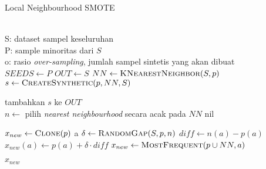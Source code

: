 \begin{algorithm}[htbp]
	\caption{Local Neighbourhood SMOTE}
	\label{alg:lnsmote}
	\begin{algorithmic}[1]
\Require \\
S: dataset sampel keseluruhan \\
P: sample minoritas dari $ S $ \\
o: rasio \textit{over-sampling}, jumlah sampel sintetis yang akan dibuat \\

	\State $ SEEDS \gets P $
	\State $ OUT \gets S $
		\State $ NN \gets \Call{KNearestNeighbor}{S, p} $
			\State $ s \gets \Call{CreateSynthetic}{p, NN, S} $

				\State tambahkan $ s $ ke $OUT$
			\EndIf
		\EndFor
	\EndFor
	\State {}
\EndFunction
\\
	\State $ n \gets $ pilih \textit{nearest neighbourhood} secara acak
	pada $ NN $
		\State \Return nil
	\EndIf

	\State $ x_{new} \gets \Call{Clone}{p} $
	a
			\State $ \delta \gets \Call{RandomGap}{S, p, n} $
			\State $ diff \gets n(a) - p(a) $
			\State $ x_{new}(a) \gets p(a) + \delta \cdot diff $
		\Else
			\State $ x_{new} \gets \Call{MostFrequent}{p \cup NN, a} $
		\EndIf
	\EndFor

	\State \Return $ x_{new} $
\EndFunction
	\end{algorithmic}
\end{algorithm}

